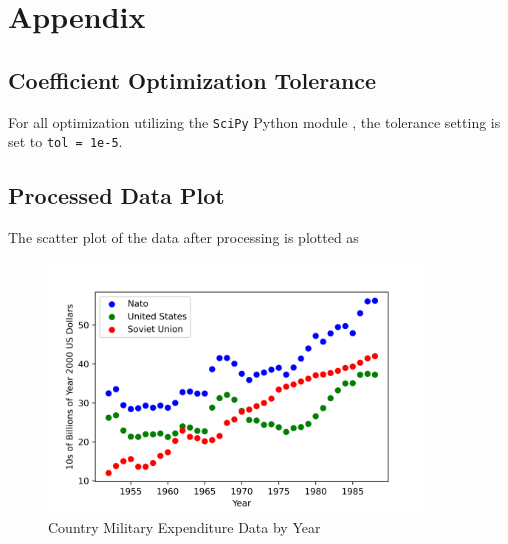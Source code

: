 \documentclass[12pt, centerh1]{article}
\begin{document}
\newpage
\section*{Appendix}
\subsection{Coefficient Optimization Tolerance}
For all optimization utilizing the \texttt{SciPy} Python module \citep{2020SciPy-NMeth}, the tolerance setting is set to \texttt{tol = 1e-5}.

\subsection{Processed Data Plot}
The scatter plot of the data after processing is plotted as
\begin{figure}[!htb]
    \centering
    \includegraphics[width=10cm]{NUS0.png}
    \caption{Country Military Expenditure Data by Year}
    \label{fig:data}
\end{figure}
\end{document}
